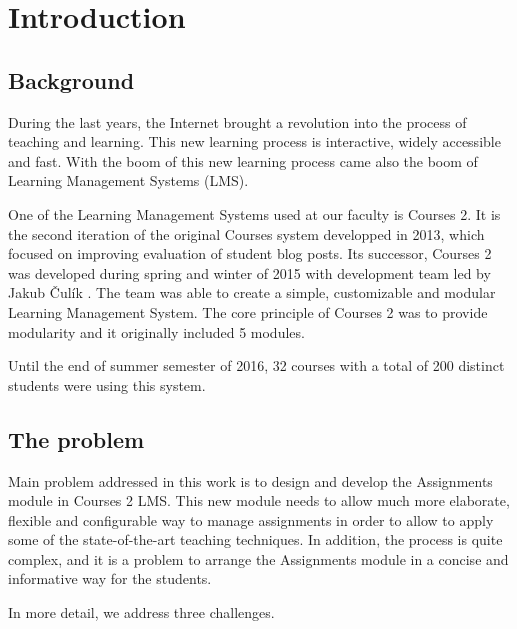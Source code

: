 \chapter*{Introduction}

\section*{Background}
During the last years, the Internet brought a revolution into the process of teaching and learning. This new learning process is interactive, widely accessible and fast. With the boom of this new learning process came also the boom of Learning Management Systems (LMS).


One of the Learning Management Systems used at our faculty is Courses 2. It is the second iteration of the original Courses system developped in 2013, which focused on improving evaluation of student blog posts.  Its successor, Courses 2  was developed during spring and winter of 2015 with development team led by Jakub \v{C}ul\'{i}k \cite{culik}. The team was able to create a simple, customizable and modular Learning Management System. The core principle of Courses 2 was to provide modularity and it originally included 5 modules. 

Until the end of summer semester of 2016, 32 courses with a total of 200 distinct students were using this system.


\section*{The problem}

Main problem addressed in this work is to design and develop the Assignments module in Courses 2 LMS. This new module needs to allow much more elaborate, flexible and configurable way to manage assignments in order to allow to apply some of the state-of-the-art teaching techniques. In addition, the process is quite complex, and it is a problem to arrange the Assignments module in a concise and informative way for the students. 

In more detail, we address three challenges.

